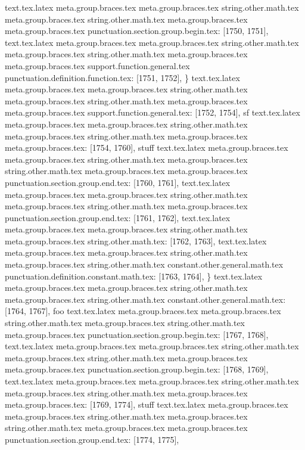 {{{{{{{{{{{{{{{{{{{{{{{{{{{{{{{{{{{{{{{{{{{{{{{text.tex.latex meta.group.braces.tex meta.group.braces.tex string.other.math.tex meta.group.braces.tex string.other.math.tex meta.group.braces.tex meta.group.braces.tex punctuation.section.group.begin.tex: [1750, 1751], {{}
text.tex.latex meta.group.braces.tex meta.group.braces.tex string.other.math.tex meta.group.braces.tex string.other.math.tex meta.group.braces.tex meta.group.braces.tex support.function.general.tex punctuation.definition.function.tex: [1751, 1752], {\}
text.tex.latex meta.group.braces.tex meta.group.braces.tex string.other.math.tex meta.group.braces.tex string.other.math.tex meta.group.braces.tex meta.group.braces.tex support.function.general.tex: [1752, 1754], {sf}
text.tex.latex meta.group.braces.tex meta.group.braces.tex string.other.math.tex meta.group.braces.tex string.other.math.tex meta.group.braces.tex meta.group.braces.tex: [1754, 1760], { stuff}
text.tex.latex meta.group.braces.tex meta.group.braces.tex string.other.math.tex meta.group.braces.tex string.other.math.tex meta.group.braces.tex meta.group.braces.tex punctuation.section.group.end.tex: [1760, 1761], {}}
text.tex.latex meta.group.braces.tex meta.group.braces.tex string.other.math.tex meta.group.braces.tex string.other.math.tex meta.group.braces.tex punctuation.section.group.end.tex: [1761, 1762], {}}
text.tex.latex meta.group.braces.tex meta.group.braces.tex string.other.math.tex meta.group.braces.tex string.other.math.tex: [1762, 1763], {
}
text.tex.latex meta.group.braces.tex meta.group.braces.tex string.other.math.tex meta.group.braces.tex string.other.math.tex constant.other.general.math.tex punctuation.definition.constant.math.tex: [1763, 1764], {\}
text.tex.latex meta.group.braces.tex meta.group.braces.tex string.other.math.tex meta.group.braces.tex string.other.math.tex constant.other.general.math.tex: [1764, 1767], {foo}
text.tex.latex meta.group.braces.tex meta.group.braces.tex string.other.math.tex meta.group.braces.tex string.other.math.tex meta.group.braces.tex punctuation.section.group.begin.tex: [1767, 1768], {{}
text.tex.latex meta.group.braces.tex meta.group.braces.tex string.other.math.tex meta.group.braces.tex string.other.math.tex meta.group.braces.tex meta.group.braces.tex punctuation.section.group.begin.tex: [1768, 1769], {{}
text.tex.latex meta.group.braces.tex meta.group.braces.tex string.other.math.tex meta.group.braces.tex string.other.math.tex meta.group.braces.tex meta.group.braces.tex: [1769, 1774], {stuff}
text.tex.latex meta.group.braces.tex meta.group.braces.tex string.other.math.tex meta.group.braces.tex string.other.math.tex meta.group.braces.tex meta.group.braces.tex punctuation.section.group.end.tex: [1774, 1775], {}}
}}}}}}}}}}}}}}}}}}}}}}}}}}}}}}}}}}}}}}}}}}}}}}}}}
